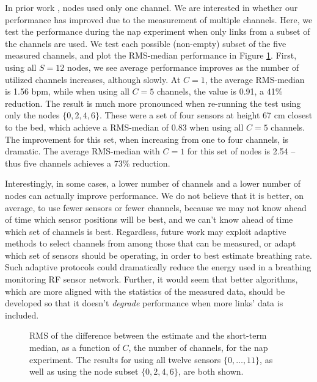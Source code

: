 \documentclass[10pt,journal,letterpaper]{IEEEtran}
\begin{document}
In prior work \cite{patwari11breathing}, nodes used only one channel.  We are interested in whether our performance has improved due to the measurement of multiple channels.  Here, we test the performance during the nap experiment when only links from a subset of the channels are used.  We test each possible (non-empty) subset of the five measured channels, and plot the RMS-median performance in Figure \ref{F:nap_rmsdm_subset_channels}.  First, using all $S=12$ nodes, we see average performance improves as the number of utilized channels increases, although slowly.  At $C=1$, the average RMS-median is 1.56 bpm, while when using all $C=5$ channels, the value is 0.91, a 41\% reduction.  The result is much more pronounced when re-running the test using only the nodes $\{0,2,4,6\}$.  These were a set of four sensors at height 67 cm closest to the bed, which achieve a RMS-median of 0.83 when using all $C=5$ channels.  The improvement for this set, when increasing from one to four channels, is dramatic.  The 
average RMS-median with $C=1$ for this set of nodes is 2.54 -- thus five channels achieves a 73\% reduction.  

Interestingly, in some cases, a lower number of channels and a lower number of nodes can actually improve performance.  We do not believe that it is better, on average, to use fewer sensors or fewer channels, because we may not know ahead of time which sensor positions will be best, and we can't know ahead of time which set of channels is best.  Regardless, future work may exploit adaptive methods to select channels from among those that can be measured, or adapt which set of sensors should be operating, in order to best estimate breathing rate.  Such adaptive protocols could dramatically reduce the energy used in a breathing monitoring RF sensor network.  Further, it would seem that better algorithms, which are more aligned with the statistics of the measured data, should be developed so that it doesn't \emph{degrade} performance when more links' data is included.

\begin{figure}[htbp]
\centerline{ }
\caption{RMS of the difference between the estimate and the short-term median, as a function of $C$, the number of channels, for the nap experiment.  The results for using all twelve sensors $\{0, \ldots, 11\}$, as well as using the node subset $\{0,2,4,6\}$, are both shown. }
    \label{F:nap_rmsdm_subset_channels}
\end{figure}
\end{document}
